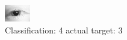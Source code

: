 \begin{figure}[h!]
\begin{center}
\includegraphics[width=0.60\columnwidth]{figures/ID76_class_4_target_3.png}
\end{center}
\caption{ Classification: 4 actual target: 3}
\label{fig:ID76_class_4_target_3}
\end{figure}
